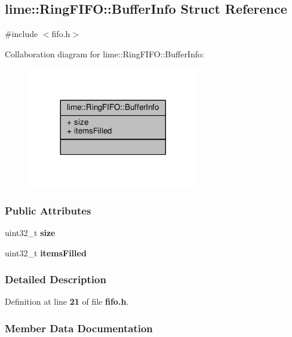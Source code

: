 \subsection{lime\+:\+:Ring\+F\+I\+FO\+:\+:Buffer\+Info Struct Reference}
\label{structlime_1_1RingFIFO_1_1BufferInfo}


{\ttfamily \#include $<$fifo.\+h$>$}



Collaboration diagram for lime\+:\+:Ring\+F\+I\+FO\+:\+:Buffer\+Info\+:
\nopagebreak
\begin{figure}[H]
\begin{center}
\leavevmode
\includegraphics[width=212pt]{d5/ddf/structlime_1_1RingFIFO_1_1BufferInfo__coll__graph}
\end{center}
\end{figure}
\subsubsection*{Public Attributes}
\begin{DoxyCompactItemize}
\item 
uint32\+\_\+t {\bf size}
\item 
uint32\+\_\+t {\bf items\+Filled}
\end{DoxyCompactItemize}


\subsubsection{Detailed Description}


Definition at line {\bf 21} of file {\bf fifo.\+h}.



\subsubsection{Member Data Documentation}
